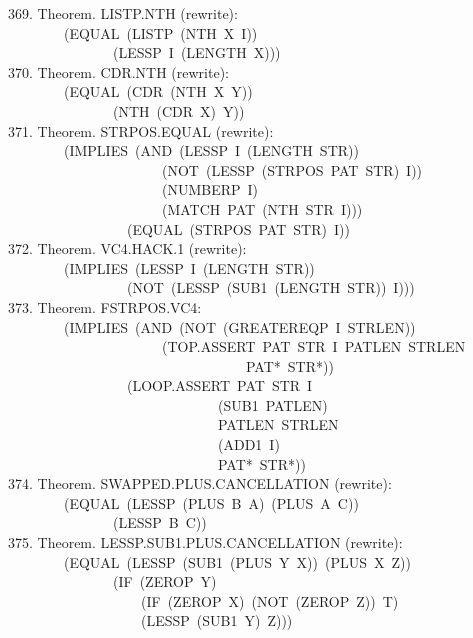 \documentclass[10pt]{book}
\newenvironment{pubasis}{\begin{flushleft}}{\end{flushleft}}
\begin{document}
\begin{pubasis}
369.    Theorem.  LISTP.NTH (rewrite):\\
~~~~~~~~(EQUAL~(LISTP~(NTH~X~I))\\
~~~~~~~~~~~~~~~(LESSP~I~(LENGTH~X)))\\

370.    Theorem.  CDR.NTH (rewrite):\\
~~~~~~~~(EQUAL~(CDR~(NTH~X~Y))\\
~~~~~~~~~~~~~~~(NTH~(CDR~X)~Y))\\

371.    Theorem.  STRPOS.EQUAL (rewrite):\\
~~~~~~~~(IMPLIES~(AND~(LESSP~I~(LENGTH~STR))\\
~~~~~~~~~~~~~~~~~~~~~~(NOT~(LESSP~(STRPOS~PAT~STR)~I))\\
~~~~~~~~~~~~~~~~~~~~~~(NUMBERP~I)\\
~~~~~~~~~~~~~~~~~~~~~~(MATCH~PAT~(NTH~STR~I)))\\
~~~~~~~~~~~~~~~~~(EQUAL~(STRPOS~PAT~STR)~I))\\

372.    Theorem.  VC4.HACK.1 (rewrite):\\
~~~~~~~~(IMPLIES~(LESSP~I~(LENGTH~STR))\\
~~~~~~~~~~~~~~~~~(NOT~(LESSP~(SUB1~(LENGTH~STR))~I)))\\

373.    Theorem.  FSTRPOS.VC4:\\
~~~~~~~~(IMPLIES~(AND~(NOT~(GREATEREQP~I~STRLEN))\\
~~~~~~~~~~~~~~~~~~~~~~(TOP.ASSERT~PAT~STR~I~PATLEN~STRLEN\\
~~~~~~~~~~~~~~~~~~~~~~~~~~~~~~~~~~PAT*~STR*))\\
~~~~~~~~~~~~~~~~~(LOOP.ASSERT~PAT~STR~I\\
~~~~~~~~~~~~~~~~~~~~~~~~~~~~~~(SUB1~PATLEN)\\
~~~~~~~~~~~~~~~~~~~~~~~~~~~~~~PATLEN~STRLEN\\
~~~~~~~~~~~~~~~~~~~~~~~~~~~~~~(ADD1~I)\\
~~~~~~~~~~~~~~~~~~~~~~~~~~~~~~PAT*~STR*))\\

374.    Theorem.  SWAPPED.PLUS.CANCELLATION (rewrite):\\
~~~~~~~~(EQUAL~(LESSP~(PLUS~B~A)~(PLUS~A~C))\\
~~~~~~~~~~~~~~~(LESSP~B~C))\\

375.    Theorem.  LESSP.SUB1.PLUS.CANCELLATION (rewrite):\\
~~~~~~~~(EQUAL~(LESSP~(SUB1~(PLUS~Y~X))~(PLUS~X~Z))\\
~~~~~~~~~~~~~~~(IF~(ZEROP~Y)\\
~~~~~~~~~~~~~~~~~~~(IF~(ZEROP~X)~(NOT~(ZEROP~Z))~T)\\
~~~~~~~~~~~~~~~~~~~(LESSP~(SUB1~Y)~Z)))\\


\end{pubasis}
\end{document}
